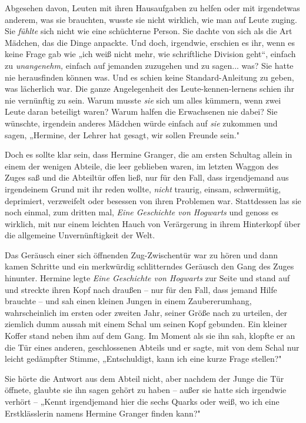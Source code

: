 {Abgesehen davon, Leuten mit ihren Hausaufgaben zu helfen oder mit irgendetwas anderem, was sie brauchten, wusste sie nicht wirklich, wie man auf Leute zuging. Sie \emph{fühlte} sich nicht wie eine schüchterne Person. Sie dachte von sich als die Art Mädchen, das die Dinge anpackte. Und doch, irgendwie, erschien es ihr, wenn es keine Frage gab wie „ich weiß nicht mehr, wie schriftliche Division geht“, einfach zu \emph{unangenehm,} einfach auf jemanden zuzugehen und zu sagen... was? Sie hatte nie herausfinden können was. Und es schien keine Standard-Anleitung zu geben, was lächerlich war. Die ganze Angelegenheit des Leute-kennen-lernens schien ihr nie vernünftig zu sein. Warum musste \emph{sie} sich um alles kümmern, wenn zwei Leute daran beteiligt waren? Warum halfen die Erwachsenen nie dabei? Sie wünschte, irgendein anderes Mädchen würde einfach auf \emph{sie} zukommen und sagen, „Hermine, der Lehrer hat gesagt, wir sollen Freunde sein."

Doch es sollte klar sein, dass Hermine Granger, die am ersten Schultag allein in einem der wenigen Abteile, die leer geblieben waren, im letzten Waggon des Zuges saß und die Abteiltür offen ließ, nur für den Fall, dass irgendjemand aus irgendeinem Grund mit ihr reden wollte, \emph{nicht} traurig, einsam, schwermütig, deprimiert, verzweifelt oder besessen von ihren Problemen war. Stattdessen las sie noch einmal, zum dritten mal, \emph{Eine Geschichte von Hogwarts} und genoss es wirklich, mit nur einem leichten Hauch von Verärgerung in ihrem Hinterkopf über die allgemeine Unvernünftigkeit der Welt.

Das Geräusch einer sich öffnenden Zug-Zwischentür war zu hören und dann kamen Schritte und ein merkwürdig schlitterndes Geräusch den Gang des Zuges hinunter. Hermine legte \emph{Eine Geschichte von Hogwarts} zur Seite und stand auf und streckte ihren Kopf nach draußen -- nur für den Fall, dass jemand Hilfe brauchte -- und sah einen kleinen Jungen in einem Zaubererumhang, wahrscheinlich im ersten oder zweiten Jahr, seiner Größe nach zu urteilen, der ziemlich dumm aussah mit einem Schal um seinen Kopf gebunden. Ein kleiner Koffer stand neben ihm auf dem Gang. Im Moment als sie ihn sah, klopfte er an die Tür eines anderen, geschlossenen Abteils und er sagte, mit von dem Schal nur leicht gedämpfter Stimme, „Entschuldigt, kann ich eine kurze Frage stellen?"

Sie hörte die Antwort aus dem Abteil nicht, aber nachdem der Junge die Tür öffnete, glaubte sie ihn sagen gehört zu haben -- außer sie hatte sich irgendwie verhört -- „Kennt irgendjemand hier die sechs Quarks oder weiß, wo ich eine Erstklässlerin namens Hermine Granger finden kann?"

}
